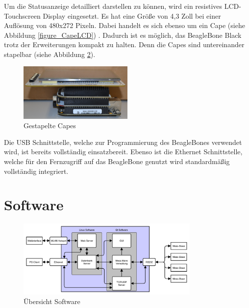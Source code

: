 Um die Statusanzeige detailliert darstellen zu können, wird ein resistives LCD-Touchscreen Display eingesetzt. Es hat eine Größe von 4,3 Zoll bei einer Auflösung von 480x272 Pixeln. Dabei handelt es sich ebenso um ein Cape (siehe Abbildung \ref{figure_CapeLCD}) . Dadurch ist es möglich, das BeagleBone Black trotz der Erweiterungen kompakt zu halten. Denn die Capes sind untereinander stapelbar (siehe Abbildung \ref{figure_GestapelteCapes}).\ 


\begin{figure}[H]
\begin{center}
\includegraphics[width=0.5\textwidth ]{img/general/GestapelteCapes2.JPG}
\caption{Gestapelte Capes}
\label{figure_GestapelteCapes}
\end{center}
\end{figure}

Die USB Schnittstelle, welche zur Programmierung des BeagleBones verwendet wird, ist bereits vollständig einsatzbereit. Ebenso ist die Ethernet Schnittstelle, welche für den Fernzugriff auf das BeagleBone genutzt wird standardmäßig vollständig integriert.

\section{Software}
\label{ServerSoftware}

\begin{figure}[H]
\begin{center}
\includegraphics[width=0.8\textwidth ]{img/general/UebersichtMasterSoftware.pdf}
\caption{Übersicht Software}
\label{figure_GestapelteCapes}
\end{center}
\end{figure}

